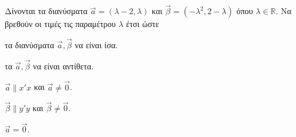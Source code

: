 Δίνονται τα διανύσματα $ \vec{a}=(\lambda-2,\lambda) $ και $ \vec{\beta}=(-\lambda^2,2-\lambda) $ όπου $ \lambda\in\mathbb{R} $. Να βρεθούν οι τιμές τις παραμέτρου $ \lambda $ έτσι ώστε
\begin{alist}
\item τα διανύσματα $ \vec{a},\vec{\beta} $ να είναι ίσα.
\item τα $ \vec{a},\vec{\beta} $ να είναι αντίθετα.
\item $\vec{a}\parallel x'x$ και $ \vec{a}\neq\vec{0} $.
\item $ \vec{\beta}\parallel y'y $ και $ \vec{\beta}\neq\vec{0} $.
\item $ \vec{a}=\vec{0} $.
\end{alist}
